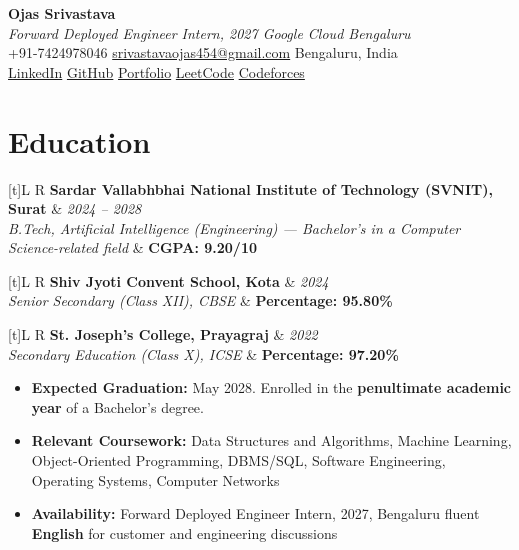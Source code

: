 \documentclass[a4paper,10pt]{article}
\newcommand{\resumeEdu}[4]{%
  \noindent\begin{tabularx}{\textwidth}[t]{L R}%
    \textbf{#1} & \textit{\footnotesize #2} \\%
    \textit{\footnotesize #3} & \textbf{\footnotesize #4} \\%
  \end{tabularx}\vspace{-0.5mm}%
}
\begin{document}
\selectfont

\begin{center}
  {\LARGE \textbf{Ojas Srivastava}} \\[0.5mm]
  \small\textit{Forward Deployed Engineer Intern, 2027 \textbar{} Google Cloud \textbar{} Bengaluru} \\[0.5mm]
  \small
  +91-7424978046 \textbar{}
  \href{mailto:srivastavaojas454@gmail.com}{srivastavaojas454@gmail.com} \textbar{}
  Bengaluru, India \\[0.5mm]
  \href{https://linkedin.com/in/ojas-srivastava05}{LinkedIn} \textbar{}
  \href{https://github.com/Ojas-Srivastava05}{GitHub} \textbar{}
  \href{https://ojas-srivastava.vercel.app}{Portfolio} \textbar{}
  \href{https://leetcode.com/Oju_Srivastava}{LeetCode} \textbar{}
  \href{https://codeforces.com/profile/Oju}{Codeforces}
\end{center}

\vspace{-2mm}

\section{Education}
\small
\resumeEdu
  {Sardar Vallabhbhai National Institute of Technology (SVNIT), Surat}
  {2024 -- 2028}
  {B.Tech, Artificial Intelligence (Engineering) --- Bachelor's in a Computer Science-related field}
  {CGPA: 9.20/10}
\resumeEdu
  {Shiv Jyoti Convent School, Kota}
  {2024}
  {Senior Secondary (Class XII), CBSE}
  {Percentage: 95.80\%}
\resumeEdu
  {St. Joseph's College, Prayagraj}
  {2022}
  {Secondary Education (Class X), ICSE}
  {Percentage: 97.20\%}
\vspace{1mm}
\begin{itemize}[leftmargin=*, topsep=2pt, itemsep=0pt, parsep=0pt]
  \item \textbf{Expected Graduation:} May 2028. Enrolled in the \textbf{penultimate academic year} of a Bachelor's degree.
  \item \textbf{Relevant Coursework:} Data Structures and Algorithms, Machine Learning, Object-Oriented Programming, DBMS/SQL, Software Engineering, Operating Systems, Computer Networks
  \item \textbf{Availability:} Forward Deployed Engineer Intern, 2027, Bengaluru \textbar{} fluent \textbf{English} for customer and engineering discussions
\end{itemize}
\end{document}
